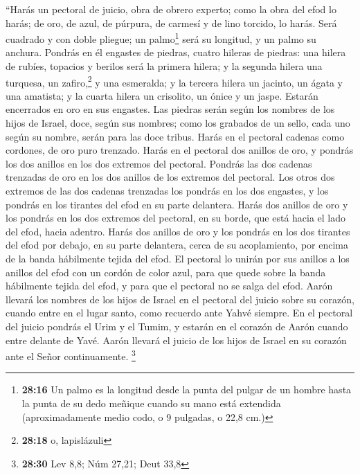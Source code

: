  ``Harás un pectoral de juicio, obra de obrero experto;
como la obra del efod lo harás; de oro, de azul, de púrpura, de carmesí
y de lino torcido, lo harás.  Será cuadrado y con doble
pliegue; un palmo\footnote{\textbf{28:16} Un palmo es la longitud desde
  la punta del pulgar de un hombre hasta la punta de su dedo meñique
  cuando su mano está extendida (aproximadamente medio codo, o 9
  pulgadas, o 22,8 cm.)} será su longitud, y un palmo su anchura.
 Pondrás en él engastes de piedras, cuatro hileras de
piedras: una hilera de rubíes, topacios y berilos será la primera
hilera;  y la segunda hilera una turquesa, un
zafiro,\footnote{\textbf{28:18} o, lapislázuli} y una esmeralda;
 y la tercera hilera un jacinto, un ágata y una amatista;
 y la cuarta hilera un crisolito, un ónice y un jaspe.
Estarán encerrados en oro en sus engastes.  Las piedras
serán según los nombres de los hijos de Israel, doce, según sus nombres;
como los grabados de un sello, cada uno según su nombre, serán para las
doce tribus.  Harás en el pectoral cadenas como cordones,
de oro puro trenzado.  Harás en el pectoral dos anillos
de oro, y pondrás los dos anillos en los dos extremos del pectoral.
 Pondrás las dos cadenas trenzadas de oro en los dos
anillos de los extremos del pectoral.  Los otros dos
extremos de las dos cadenas trenzadas los pondrás en los dos engastes, y
los pondrás en los tirantes del efod en su parte delantera.
 Harás dos anillos de oro y los pondrás en los dos
extremos del pectoral, en su borde, que está hacia el lado del efod,
hacia adentro.  Harás dos anillos de oro y los pondrás en
los dos tirantes del efod por debajo, en su parte delantera, cerca de su
acoplamiento, por encima de la banda hábilmente tejida del efod.
 El pectoral lo unirán por sus anillos a los anillos del
efod con un cordón de color azul, para que quede sobre la banda
hábilmente tejida del efod, y para que el pectoral no se salga del efod.
 Aarón llevará los nombres de los hijos de Israel en el
pectoral del juicio sobre su corazón, cuando entre en el lugar santo,
como recuerdo ante Yahvé siempre.  En el pectoral del
juicio pondrás el Urim y el Tumim, y estarán en el corazón de Aarón
cuando entre delante de Yavé. Aarón llevará el juicio de los hijos de
Israel en su corazón ante el Señor continuamente. \footnote{\textbf{28:30}
  Lev 8,8; Núm 27,21; Deut 33,8}

